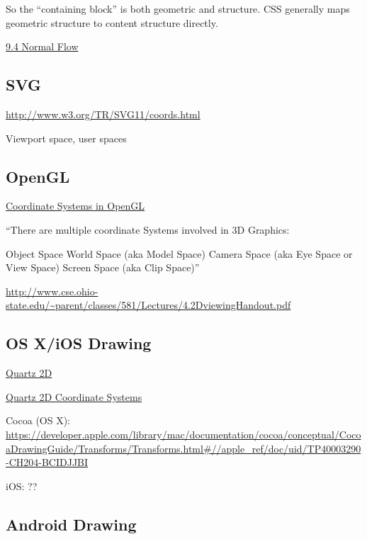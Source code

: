 \documentclass{tufte-handout}
\numberwithin{equation}{subsection}
\begin{document}
So the ``containing block'' is both geometric and structure.  CSS
generally maps geometric structure to content structure directly.

\href{http://www.w3.org/TR/CSS2/visuren.html#normal-flow}{9.4 Normal Flow}


\subsection{SVG}

\url{http://www.w3.org/TR/SVG11/coords.html}

Viewport space, user spaces

\subsection{OpenGL}
\label{subs:opengl}


\href{http://www.matrix44.net/cms/notes/opengl-3d-graphics/coordinate-systems-in-opengl}{Coordinate Systems in OpenGL}

``There are multiple coordinate Systems involved in 3D Graphics:

Object Space
World Space (aka Model Space)
Camera Space (aka Eye Space or View Space)
Screen Space (aka Clip Space)''

\url{http://www.cse.ohio-state.edu/~parent/classes/581/Lectures/4.2DviewingHandout.pdf}

\subsection{OS X/iOS Drawing}

\href{https://developer.apple.com/library/mac/documentation/graphicsimaging/conceptual/drawingwithquartz2d/dq\_overview/dq\_overview.html}{Quartz 2D}

\href{https://developer.apple.com/library/mac/documentation/graphicsimaging/conceptual/drawingwithquartz2d/dq\_overview/dq\_overview.html#//apple\_ref/doc/uid/TP30001066-CH202-CJBBAEEC}{Quartz 2D Coordinate Systems}

Cocoa (OS X):  \url{https://developer.apple.com/library/mac/documentation/cocoa/conceptual/CocoaDrawingGuide/Transforms/Transforms.html#//apple\_ref/doc/uid/TP40003290-CH204-BCIDJJBI}

iOS:  ??

\subsection{Android Drawing}
\end{document}
